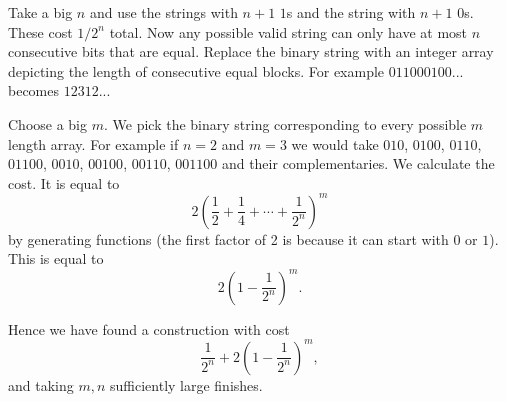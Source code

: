 \begin{solution}[name={Solution by Gabriel Goh}]
	Take a big $n$ and use the strings with $n+1$ $1$s and the string with $n+1$ $0$s. These cost ${1}/{2^n}$ total.
	Now any possible valid string can only have at most $n$ consecutive bits that are equal. Replace the binary string with an integer array depicting the length of consecutive equal blocks. For example $011000100...$ becomes $12312...$
	
	Choose a big $m$. We pick the binary string corresponding to every possible $m$ length array. For example if $n=2$ and $m=3$ we would take $010$, $0100$, $0110$, $01100$, $0010$, $00100$, $00110$, $001100$ and their complementaries. We calculate the cost. It is equal to $$2\left(\frac{1}{2}+\frac{1}{4}+\cdots+\frac{1}{2^n}\right)^m$$ by generating functions (the first factor of 2 is because it can start with $0$ or $1$). This is equal to $$2\left(1-\frac{1}{2^n}\right)^m.$$
	
	Hence we have found a construction with cost $$\frac{1}{2^n}+2\left(1-\frac{1}{2^n}\right)^m,$$ and taking $m,n$ sufficiently large finishes.
\end{solution}

